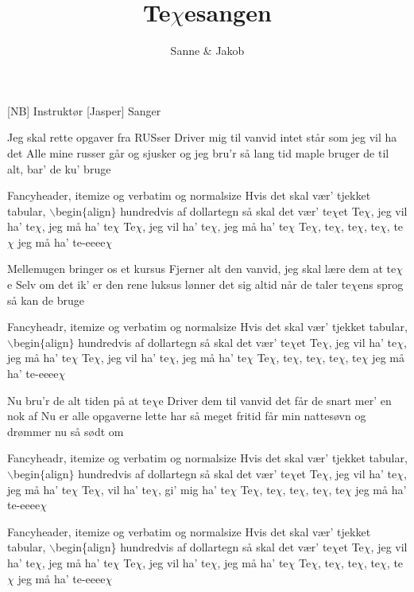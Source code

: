 \documentclass[a4paper,11pt]{article}
\title{Te$\chi$esangen}
\author{Sanne \& Jakob}
\begin{document}
\maketitle

\begin{roles}
[NB] Instruktør
[Jasper] Sanger
\end{roles}

\begin{song}
   Jeg skal rette opgaver fra RUSser
Driver mig til vanvid 
intet står som jeg vil ha det
Alle mine russer går og sjusker
og jeg bru'r så lang tid
maple bruger de til alt, bar' de ku' bruge

Fancyheader, itemize
og verbatim og normalsize
Hvis det skal vær' tjekket
tabular, $\backslash$begin$\{$align$\}$
hundredvis af dollartegn
så skal det vær' te$\chi$et
Te$\chi$, jeg vil ha' te$\chi$, jeg må ha' te$\chi$
Te$\chi$, jeg vil ha' te$\chi$, jeg må ha' te$\chi$
Te$\chi$, te$\chi$, te$\chi$, te$\chi$, te$\chi$
jeg må ha' te-eeee$\chi$

Mellemugen bringer os et kursus
Fjerner alt den vanvid,
jeg skal lære dem at te$\chi$e
Selv om det ik' er den rene luksus 
lønner det sig altid
når de taler te$\chi$ens sprog
så kan de bruge

Fancyheadr, itemize
og verbatim og normalsize
Hvis det skal vær' tjekket
tabular, $\backslash$begin$\{$align$\}$
hundredvis af dollartegn
så skal det vær' te$\chi$et
Te$\chi$, jeg vil ha' te$\chi$, jeg må ha' te$\chi$
Te$\chi$, jeg vil ha' te$\chi$, jeg må ha' te$\chi$
Te$\chi$, te$\chi$, te$\chi$, te$\chi$, te$\chi$
jeg må ha' te-eeee$\chi$

Nu bru'r de alt tiden på at te$\chi$e
Driver dem til vanvid
det får de snart mer' en nok af
Nu er alle opgaverne lette
har så meget fritid
får min nattesøvn
og drømmer nu så sødt om

Fancyheadr, itemize
og verbatim og normalsize
Hvis det skal vær' tjekket
tabular, $\backslash$begin$\{$align$\}$
hundredvis af dollartegn
så skal det vær' te$\chi$et
Te$\chi$, jeg vil ha' te$\chi$, jeg må ha' te$\chi$
Te$\chi$, vil ha' te$\chi$, gi' mig ha' te$\chi$
Te$\chi$, te$\chi$, te$\chi$, te$\chi$, te$\chi$
jeg må ha' te-eeee$\chi$

Fancyheader, itemize
og verbatim og normalsize
Hvis det skal vær' tjekket
tabular, $\backslash$begin\{align\}
hundredvis af dollartegn
så skal det vær' te$\chi$et
Te$\chi$, jeg vil ha' te$\chi$, jeg må ha' te$\chi$
Te$\chi$, jeg vil ha' te$\chi$, jeg må ha' te$\chi$
Te$\chi$, te$\chi$, te$\chi$, te$\chi$, te$\chi$
jeg må ha' te-eeee$\chi$
\end{song}
\end{document}

